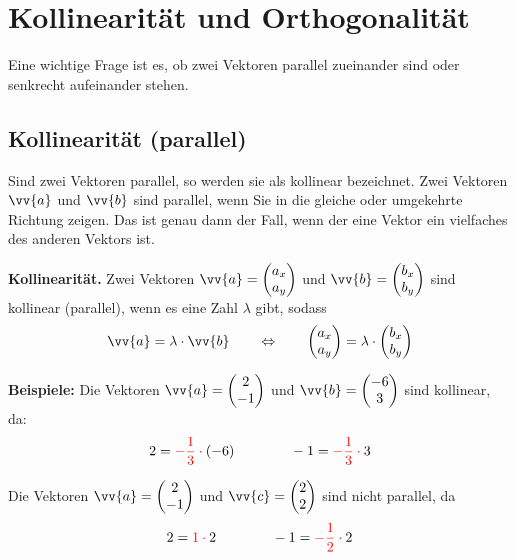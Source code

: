 \newpage
\section{Kollinearität und Orthogonalität}

Eine wichtige Frage ist es, ob zwei Vektoren parallel zueinander sind oder senkrecht aufeinander stehen.

\subsection{Kollinearität (parallel)}

Sind zwei Vektoren parallel, so werden sie als kollinear bezeichnet. Zwei Vektoren $\vv{a}$ und $\vv{b}$ sind parallel, wenn Sie in die gleiche oder umgekehrte Richtung zeigen. Das ist genau dann der Fall, wenn der eine Vektor ein vielfaches des anderen Vektors ist.

\begin{theorem}
  \textbf{Kollinearität.} Zwei Vektoren $\vv{a} = \vxy{a_{x},a_{y}}$ und $\vv{b} = \vxy{b_{x},b_{y}}$ sind kollinear (parallel), wenn es eine Zahl $\lambda$ gibt, sodass
  \[
    \vv{a} = \lambda\cdot\vv{b} \qquad\Leftrightarrow\qquad \vxy{a_{x},a_{y}} = \lambda\cdot\vxy{b_{x},b_{y}}
  \]
\end{theorem}

\begin{center}
\end{center}

\begin{example}
  \textbf{Beispiele:} Die Vektoren $\vv{a} = \vxy{2,-1}$ und $\vv{b} = \vxy{-6,3}$ sind kollinear, da:
  \[
     2 = \mathcolor{red}{-\frac{1}{3}\cdot} (-6) \qquad\qquad -1 = \mathcolor{red}{-\frac{1}{3}\cdot} 3
  \]

  Die Vektoren $\vv{a} = \vxy{2,-1}$ und $\vv{c} = \vxy{2,2}$ sind nicht parallel, da
  \[
    2 = \mathcolor{red}{1\cdot} 2 \qquad\qquad -1 = \mathcolor{red}{-\frac{1}{2}\cdot} 2
  \]
\end{example}

